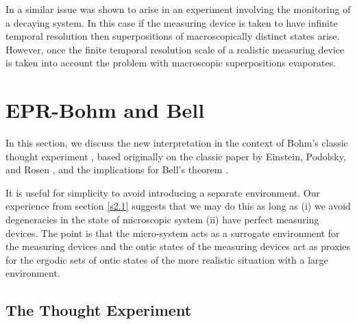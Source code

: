 \documentclass[%
preprint,
nofootinbib,
 amsmath,amssymb,
aps,
]{revtex4-1}
\begin{document}
In \cite{Hollowood:2013cbr} a similar issue was shown to arise in an experiment involving the monitoring of a decaying system. In this case if the measuring device is taken to have infinite temporal resolution then superpositions of macroscopically distinct states arise. However, once the finite temporal resolution scale of a realistic measuring device is taken into account the problem with macroscopic superpositions evaporates. 

\section{EPR-Bohm and Bell}\label{s4.1}

In this section, we discuss the new interpretation  in the context of Bohm's classic 
thought experiment \cite{Bohm:1951qt,BohmAharonov:1957depperp}, based originally
on the classic paper by Einstein, Podolsky, and Rosen \cite{EinsteinPodolskyRosen:1935cqmdprbcc}, and the implications for Bell's theorem \cite{Bell:1964oeprp}. 

It is useful for simplicity to avoid introducing a separate environment. 
Our experience from section \ref{s2.1} suggests that we may do this as long as (i) we avoid degeneracies in the state of microscopic system (ii) have perfect measuring devices. The point is that the micro-system acts as a surrogate environment for the measuring devices and the ontic states of the measuring devices act as proxies for the ergodic sets of ontic states of the more realistic situation with a large environment. 

\subsection{The Thought Experiment}
\end{document}
